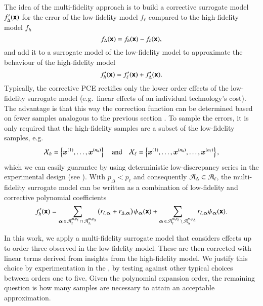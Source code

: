 
The idea of the multi-fidelity approach is to build a corrective surrogate model
$f_\Delta'(\boldsymbol{\mathsf{x}})$ for the error of the low-fidelity model $f_\ell$ compared to the
high-fidelity model $f_h$
\begin{equation}
    f_\Delta(\boldsymbol{\mathsf{x}}) = f_h(\boldsymbol{\mathsf{x}}) - f_\ell(\boldsymbol{\mathsf{x}}),
\end{equation}
and add it to a surrogate model of the low-fidelity model to approximate the
behaviour of the high-fidelity model
\begin{equation}
    f_h'(\boldsymbol{\mathsf{x}}) = f_\ell'(\boldsymbol{\mathsf{x}}) + f_\Delta'(\boldsymbol{\mathsf{x}}).
\end{equation}
Typically, the corrective PCE rectifies only the lower order effects of the
low-fidelity surrogate model (e.g.~linear effects of an individual technology's
cost).\cite{palar_multi-fidelity_2016} The advantage is that this way the
correction function can be determined based on fewer samples analogous to the
previous section . To sample the errors, it is only
required that the high-fidelity samples are a subset of the low-fidelity
samples, e.g.
\begin{equation}
    \mathcal{X}_h = \left\{ \bm{x}^{(1)}, \dots, \bm{x}^{(n_h)}\right\} \quad\text{and}\quad
    \mathcal{X}_\ell = \left\{ \bm{x}^{(1)}, \dots, \bm{x}^{(n_h)}, \dots, \bm{x}^{(n_\ell)}\right\},
\end{equation}
which we can easily guarantee by using deterministic low-discrepancy series in
the experimental design (see ). With $p_\Delta < p_\ell$
and consequently $\mathcal{A}_\Delta \subset \mathcal{A}_\ell$, the multi-fidelity surrogate
model can be written as a combination of low-fidelity and corrective polynomial
coefficients
\begin{equation}
    f_h' (\boldsymbol{\mathsf{x}}) = \sum_{{\bm{\alpha}}\,\in\,\mathcal{A}_\ell^{m,p_\ell} \,\cap\, \mathcal{A}_\Delta^{m,p_\Delta}}
    \left(
     r_{\ell,{\bm{\alpha}}} + r_{\Delta,{\bm{\alpha}}}
    \right) \psi_{\bm{\alpha}}(\boldsymbol{\mathsf{x}}) +
    \sum_{{\bm{\alpha}}\,\in\,\mathcal{A}_\ell^{m,p_\ell} \,\setminus\, \mathcal{A}_\Delta^{m,p_\Delta}}
    r_{\ell,{\bm{\alpha}}} \psi_{\bm{\alpha}}(\boldsymbol{\mathsf{x}}).
\end{equation}


In this work, we apply a multi-fidelity surrogate model that considers effects
up to order three observed in the low-fidelity model. These are then corrected
with linear terms derived from insights from the high-fidelity model. We justify
this choice by experimentation in the , by testing
against other typical choices between orders one to
five.\cite{gratiet_metamodel-based_2015} Given the polynomial expansion order,
the remaining question is how many samples are necessary to attain an acceptable
approximation.

